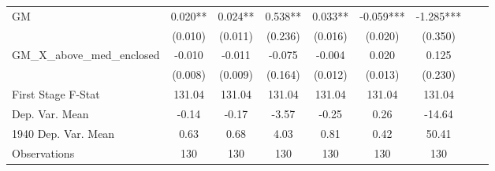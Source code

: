 \begin{tabular}{l*{8}{c}}
\cmidrule(lr){1-7}
GM              &    0.020** &    0.024** &    0.538** &    0.033** &   -0.059***&   -1.285***\\
                &  (0.010)   &  (0.011)   &  (0.236)   &  (0.016)   &  (0.020)   &  (0.350)   \\
\addlinespace
GM\_X\_above\_med\_enclosed&   -0.010   &   -0.011   &   -0.075   &   -0.004   &    0.020   &    0.125   \\
                &  (0.008)   &  (0.009)   &  (0.164)   &  (0.012)   &  (0.013)   &  (0.230)   \\
\midrule
First Stage F-Stat&   131.04   &   131.04   &   131.04   &   131.04   &   131.04   &   131.04   \\
Dep. Var. Mean  &    -0.14   &    -0.17   &    -3.57   &    -0.25   &     0.26   &   -14.64   \\
1940 Dep. Var. Mean&     0.63   &     0.68   &     4.03   &     0.81   &     0.42   &    50.41   \\
Observations    &      130   &      130   &      130   &      130   &      130   &      130   \\
       \bottomrule \end{tabular}
